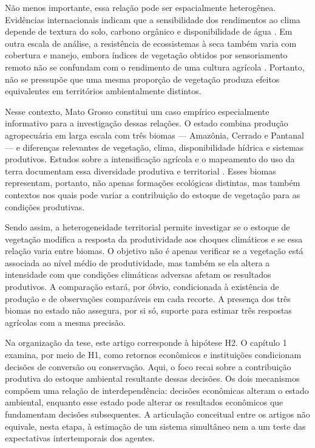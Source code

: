 Não menos importante, essa relação pode ser espacialmente heterogênea. Evidências internacionais indicam que a sensibilidade dos rendimentos ao clima depende de textura do solo, carbono orgânico e disponibilidade de água \cite{HuangEtAl2021}. Em outra escala de análise, a resistência de ecossistemas à seca também varia com cobertura e manejo, embora índices de vegetação obtidos por sensoriamento remoto não se confundam com o rendimento de uma cultura agrícola \cite{XiaoEtAl2023}. Portanto, não se pressupõe que uma mesma proporção de vegetação produza efeitos equivalentes em territórios ambientalmente distintos.

Nesse contexto, Mato Grosso constitui um caso empírico especialmente informativo para a investigação dessas relações. O estado combina produção agropecuária em larga escala com três biomas --- Amazônia, Cerrado e Pantanal --- e diferenças relevantes de vegetação, clima, disponibilidade hídrica e sistemas produtivos. Estudos sobre a intensificação agrícola e o mapeamento do uso da terra documentam essa diversidade produtiva e territorial \cite{VanWeyEtAl2013,SimoesEtAl2020}. Esses biomas representam, portanto, não apenas formações ecológicas distintas, mas também contextos nos quais pode variar a contribuição do estoque de vegetação para as condições produtivas.

Sendo assim, a heterogeneidade territorial permite investigar se o estoque de vegetação modifica a resposta da produtividade aos choques climáticos e se essa relação varia entre biomas. O objetivo não é apenas verificar se a vegetação está associada ao nível médio de produtividade, mas também se ela altera a intensidade com que condições climáticas adversas afetam os resultados produtivos. A comparação estará, por óbvio, condicionada à existência de produção e de observações comparáveis em cada recorte. A presença dos três biomas no estado não assegura, por si só, suporte para estimar três respostas agrícolas com a mesma precisão.

Na organização da tese, este artigo corresponde à hipótese H2. O capítulo 1 examina, por meio de H1, como retornos econômicos e instituições condicionam decisões de conversão ou conservação. Aqui, o foco recai sobre a contribuição produtiva do estoque ambiental resultante dessas decisões. Os dois mecanismos compõem uma relação de interdependência: decisões econômicas alteram o estado ambiental, enquanto esse estado pode alterar os resultados econômicos que fundamentam decisões subsequentes. A articulação conceitual entre os artigos não equivale, nesta etapa, à estimação de um sistema simultâneo nem a um teste das expectativas intertemporais dos agentes.


